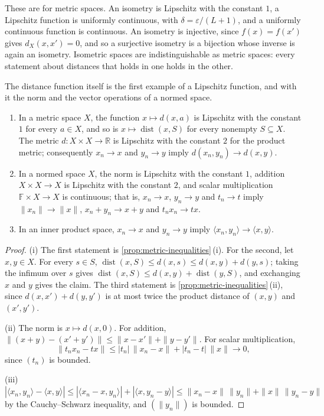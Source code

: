 These are  for metric spaces. An isometry is Lipschitz with the constant $1$, a Lipschitz function is uniformly continuous, with $\delta=\varepsilon/(L+1)$, and a uniformly continuous function is continuous. An isometry is injective, since $f(x)=f(x')$ gives $d_X(x,x')=0$, and so a surjective isometry is a bijection whose inverse is again an isometry. Isometric spaces are indistinguishable as metric spaces: every statement about distances that holds in one holds in the other.

The distance function itself is the first example of a Lipschitz function, and with it the norm and the vector operations of a normed space.

\begin{proposition}
\label{prop:distance-lipschitz}
\leavevmode
\begin{enumerate}
\item In a metric space $X$, the function $x\mapsto d(x,a)$ is Lipschitz with the constant $1$ for every $a\in X$, and so is $x\mapsto\operatorname{dist}(x,S)$ for every nonempty $S\subseteq X$. The metric $d\colon X\times X\to\mathbb R$ is Lipschitz with the constant $2$ for the product metric; consequently $x_n\to x$ and $y_n\to y$ imply $d(x_n,y_n)\to d(x,y)$.
\item In a normed space $X$, the norm is Lipschitz with the constant $1$, addition $X\times X\to X$ is Lipschitz with the constant $2$, and scalar multiplication $\mathbb F\times X\to X$ is continuous; that is, $x_n\to x$, $y_n\to y$ and $t_n\to t$ imply $\|x_n\|\to\|x\|$, $x_n+y_n\to x+y$ and $t_nx_n\to tx$.
\item In an inner product space, $x_n\to x$ and $y_n\to y$ imply $\langle x_n,y_n\rangle\to\langle x,y\rangle$.
\end{enumerate}
\end{proposition}

\begin{proof}
(i) The first statement is \cref{prop:metric-inequalities}\,(i). For the second, let $x,y\in X$. For every $s\in S$, $\operatorname{dist}(x,S)\le d(x,s)\le d(x,y)+d(y,s)$; taking the infimum over $s$ gives $\operatorname{dist}(x,S)\le d(x,y)+\operatorname{dist}(y,S)$, and exchanging $x$ and $y$ gives the claim. The third statement is \cref{prop:metric-inequalities}\,(ii), since $d(x,x')+d(y,y')$ is at most twice the product distance of $(x,y)$ and $(x',y')$.

(ii) The norm is $x\mapsto d(x,0)$. For addition, $\|(x+y)-(x'+y')\|\le\|x-x'\|+\|y-y'\|$. For scalar multiplication,
\[
\|t_nx_n-tx\|\le|t_n|\,\|x_n-x\|+|t_n-t|\,\|x\|\to0,
\]
since $(t_n)$ is bounded.

(iii) $|\langle x_n,y_n\rangle-\langle x,y\rangle|\le|\langle x_n-x,y_n\rangle|+|\langle x,y_n-y\rangle|\le\|x_n-x\|\,\|y_n\|+\|x\|\,\|y_n-y\|$ by the Cauchy--Schwarz inequality, and $(\|y_n\|)$ is bounded.
\end{proof}

